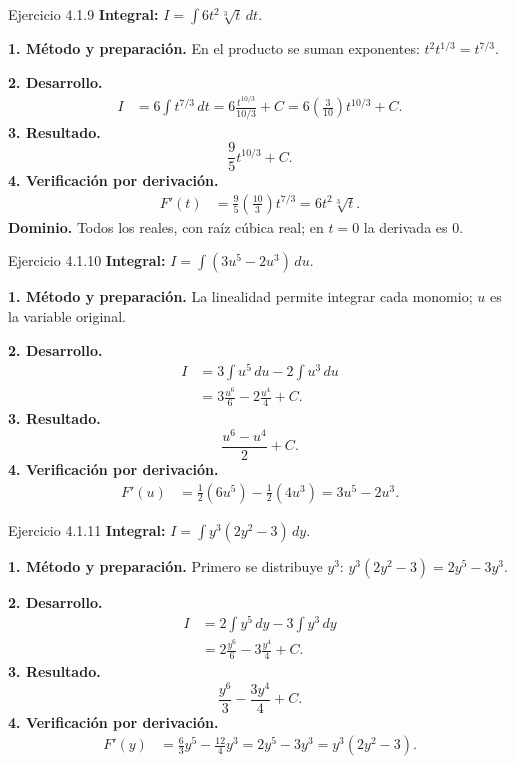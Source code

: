 \begin{examplebox}{Ejercicio 4.1.9}
\textbf{Integral:} $\displaystyle I=\int 6t^2\sqrt[3]t\,dt$.

\textbf{1. Método y preparación.} En el producto se suman exponentes: $t^2t^{1/3}=t^{7/3}$.

\textbf{2. Desarrollo.}
\begin{align*}
I&=6\int t^{7/3}\,dt=6\frac{t^{10/3}}{10/3}+C=6\left(\frac3{10}\right)t^{10/3}+C.
\end{align*}
\textbf{3. Resultado.}
\[
\frac95t^{10/3}+C.
\]
\textbf{4. Verificación por derivación.}
\begin{align*}
F'(t)&=\frac95\left(\frac{10}3\right)t^{7/3}=6t^2\sqrt[3]t.
\end{align*}
\textbf{Dominio.} Todos los reales, con raíz cúbica real; en $t=0$ la derivada es $0$.
\end{examplebox}

\begin{examplebox}{Ejercicio 4.1.10}
\textbf{Integral:} $\displaystyle I=\int (3u^5-2u^3)\,du$.

\textbf{1. Método y preparación.} La linealidad permite integrar cada monomio; $u$ es la variable original.

\textbf{2. Desarrollo.}
\begin{align*}
I&=3\int u^5\,du-2\int u^3\,du\\&=3\frac{u^6}{6}-2\frac{u^4}{4}+C.
\end{align*}
\textbf{3. Resultado.}
\[
\frac{u^6-u^4}{2}+C.
\]
\textbf{4. Verificación por derivación.}
\begin{align*}
F'(u)&=\frac12(6u^5)-\frac12(4u^3)=3u^5-2u^3.
\end{align*}
\end{examplebox}

\begin{examplebox}{Ejercicio 4.1.11}
\textbf{Integral:} $\displaystyle I=\int y^3(2y^2-3)\,dy$.

\textbf{1. Método y preparación.} Primero se distribuye $y^3$: $y^3(2y^2-3)=2y^5-3y^3$.

\textbf{2. Desarrollo.}
\begin{align*}
I&=2\int y^5\,dy-3\int y^3\,dy\\&=2\frac{y^6}{6}-3\frac{y^4}{4}+C.
\end{align*}
\textbf{3. Resultado.}
\[
\frac{y^6}{3}-\frac{3y^4}{4}+C.
\]
\textbf{4. Verificación por derivación.}
\begin{align*}
F'(y)&=\frac63y^5-\frac{12}4y^3=2y^5-3y^3=y^3(2y^2-3).
\end{align*}
\end{examplebox}

